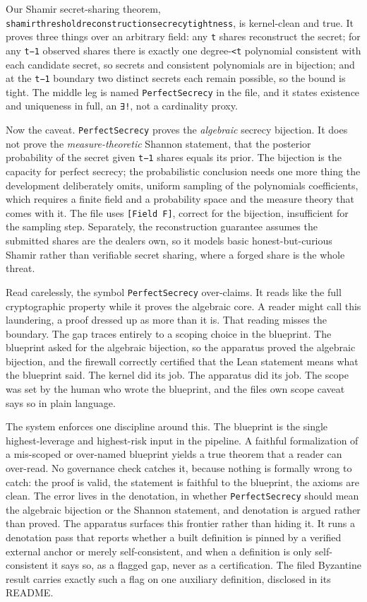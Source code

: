 \documentclass[
  11pt,
]{article}
\renewcommand{\_}{\origunderscore\allowbreak}
\begin{document}
Our Shamir secret-sharing theorem,
\texttt{shamir\_threshold\_reconstruction\_secrecy\_tightness}, is
kernel-clean and true. It proves three things over an arbitrary field:
any \texttt{t} shares reconstruct the secret; for any \texttt{t−1}
observed shares there is exactly one degree-\texttt{\textless{}t}
polynomial consistent with each candidate secret, so secrets and
consistent polynomials are in bijection; and at the \texttt{t−1}
boundary two distinct secrets each remain possible, so the bound is
tight. The middle leg is named \texttt{PerfectSecrecy} in the file, and
it states existence and uniqueness in full, an \texttt{∃!}, not a
cardinality proxy.

Now the caveat. \texttt{PerfectSecrecy} proves the \emph{algebraic}
secrecy bijection. It does not prove the \emph{measure-theoretic}
Shannon statement, that the posterior probability of the secret given
\texttt{t−1} shares equals its prior. The bijection is the capacity for
perfect secrecy; the probabilistic conclusion needs one more thing the
development deliberately omits, uniform sampling of the
polynomial\textquotesingle s coefficients, which requires a finite field
and a probability space and the measure theory that comes with it. The
file uses \texttt{{[}Field\ F{]}}, correct for the bijection,
insufficient for the sampling step. Separately, the reconstruction
guarantee assumes the submitted shares are the dealer\textquotesingle s
own, so it models basic honest-but-curious Shamir rather than verifiable
secret sharing, where a forged share is the whole threat.

Read carelessly, the symbol \texttt{PerfectSecrecy} over-claims. It
reads like the full cryptographic property while it proves the algebraic
core. A reader might call this laundering, a proof dressed up as more
than it is. That reading misses the boundary. The gap traces entirely to
a scoping choice in the blueprint. The blueprint asked for the algebraic
bijection, so the apparatus proved the algebraic bijection, and the
firewall correctly certified that the Lean statement means what the
blueprint said. The kernel did its job. The apparatus did its job. The
scope was set by the human who wrote the blueprint, and the
file\textquotesingle s own scope caveat says so in plain language.

The system enforces one discipline around this. The blueprint is the
single highest-leverage and highest-risk input in the pipeline. A
faithful formalization of a mis-scoped or over-named blueprint yields a
true theorem that a reader can over-read. No governance check catches
it, because nothing is formally wrong to catch: the proof is valid, the
statement is faithful to the blueprint, the axioms are clean. The error
lives in the denotation, in whether \texttt{PerfectSecrecy} should mean
the algebraic bijection or the Shannon statement, and denotation is
argued rather than proved. The apparatus surfaces this frontier rather
than hiding it. It runs a denotation pass that reports whether a built
definition is pinned by a verified external anchor or merely
self-consistent, and when a definition is only self-consistent it says
so, as a flagged gap, never as a certification. The filed Byzantine
result carries exactly such a flag on one auxiliary definition,
disclosed in its README.
\end{document}
